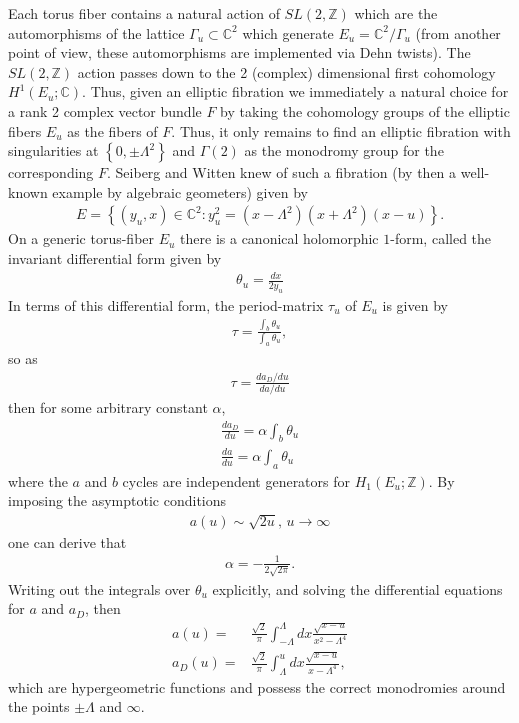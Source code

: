 \documentclass[12pt, onecolumn]{article}
\begin{document}
\noindent Each torus fiber contains a natural action of $SL(2,\mathbb{Z})$ which are the automorphisms of the lattice $\Gamma_{u} \subset \mathbb{C}^2$ which generate $E_{u}=\mathbb{C}^2/\Gamma_{u}$ (from another point of view, these automorphisms are implemented via Dehn twists).  The $SL(2,\mathbb{Z})$ action passes down to the 2 (complex) dimensional first cohomology $H^{1}(E_{u};\mathbb{C})$.  Thus, given an elliptic fibration we immediately a natural choice for a rank 2 complex vector bundle $F$ by taking the cohomology groups of the elliptic fibers $E_{u}$ as the fibers of $F$.  Thus, it only remains to find an elliptic fibration with singularities at $\left\{0,\pm \Lambda^2 \right\}$ and $\Gamma(2)$ as the monodromy group for the corresponding $F$.  Seiberg and Witten knew of such a fibration (by then a well-known example by algebraic geometers) given by
\begin{align*}
E=\left\{(y_{u},x) \in \mathbb{C}^2: y_{u}^2=(x-\Lambda^2)(x+\Lambda^2)(x-u) \right\}.
\end{align*}
On a generic torus-fiber $E_{u}$ there is a canonical holomorphic $1$-form, called the invariant differential form \cite{Husmoller} given by
\begin{align*}
\theta_{u} = \frac{dx}{2 y_{u}}
\end{align*}
In terms of this differential form, the period-matrix $\tau_{u}$ of $E_{u}$ is given by
\begin{align*}
\tau = \frac{\int_{b} \theta_{u}}{\int_{a} \theta_{u}},
\end{align*}
so as
\begin{align*}
\tau = \frac{da_{D}/du}{da/du}
\end{align*}
then for some arbitrary constant $\alpha$,
\begin{align*}
\frac{da_{D}}{du}=\alpha \int_{b} \theta_{u}\\
\frac{da}{du}=\alpha \int_{a} \theta_{u}
\end{align*}
where the $a$ and $b$ cycles are independent generators for $H_{1}(E_{u};\mathbb{Z})$.  By imposing the asymptotic conditions
\begin{align*}
a(u) \sim \sqrt{2u},\,u \rightarrow \infty
\end{align*}
one can derive that
\begin{align*}
\alpha=-\frac{1}{2\sqrt{2\pi}}.
\end{align*}
Writing out the integrals over $\theta_{u}$ explicitly, and solving the differential equations for $a$ and $a_{D}$, then
\begin{align*}
a(u)=&\frac{\sqrt{2}}{\pi}\int_{-\Lambda}^{\Lambda}dx \frac{\sqrt{x-u}}{x^2-\Lambda^4}\\
a_{D}(u)=&\frac{\sqrt{2}}{\pi}\int_{\Lambda}^{u}dx \frac{\sqrt{x-u}}{x-\Lambda^{4}},
\end{align*}
which are hypergeometric functions and possess the correct monodromies around the points $\pm \Lambda$ and $\infty$.
\end{document}
